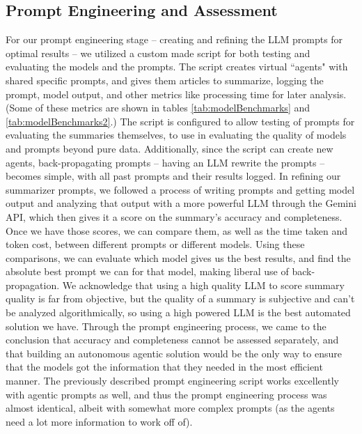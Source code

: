 \documentclass[conference]{IEEEtran}
\begin{document}
\subsection{Prompt Engineering and Assessment} %
For our prompt engineering stage -- creating and refining the LLM prompts for optimal results -- we utilized a custom made script for both testing and evaluating the models and the prompts. The script creates virtual ``agents" with shared specific prompts, and gives them articles to summarize, logging the prompt, model output, and other metrics like processing time for later analysis. (Some of these metrics are shown in tables \ref{tab:modelBenchmarks} and \ref{tab:modelBenchmarks2}.) The script is configured to allow testing of prompts for evaluating the summaries themselves, to use in evaluating the quality of models and prompts beyond pure data. Additionally, since the script can create new agents, back-propagating prompts -- having an LLM rewrite the prompts -- becomes simple, with all past prompts and their results logged. 
In refining our summarizer prompts, we followed a process of writing prompts and getting model output and analyzing that output with a more powerful LLM through the Gemini API, which then gives it a score on the summary's accuracy and completeness. Once we have those scores, we can compare them, as well as the time taken and token cost, between different prompts or different models. Using these comparisons, we can evaluate which model gives us the best results, and find the absolute best prompt we can for that model, making liberal use of back-propagation. We acknowledge that using a high quality LLM to score summary quality is far from objective, but the quality of a summary is subjective and can't be analyzed algorithmically, so using a high powered LLM is the best automated solution we have.
Through the prompt engineering process, we came to the conclusion that accuracy and completeness cannot be assessed separately, and that building an autonomous agentic solution would be the only way to ensure that the models got the information that they needed in the most efficient manner. The previously described prompt engineering script works excellently with agentic prompts as well, and thus the prompt engineering process was almost identical, albeit with somewhat more complex prompts (as the agents need a lot more information to work off of).
\end{document}
